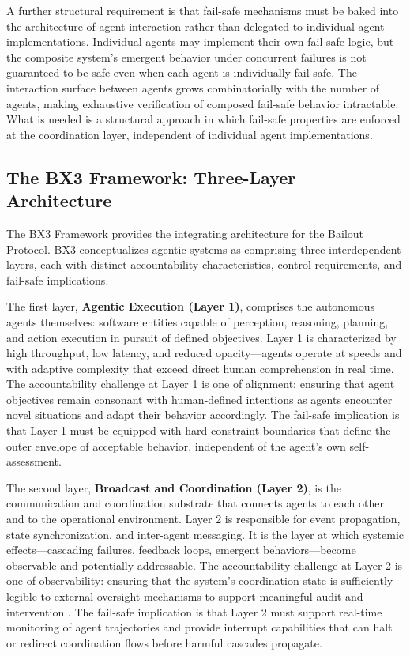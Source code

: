 A further structural requirement is that fail-safe mechanisms must be baked into the architecture of agent interaction rather than delegated to individual agent implementations. Individual agents may implement their own fail-safe logic, but the composite system's emergent behavior under concurrent failures is not guaranteed to be safe even when each agent is individually fail-safe. The interaction surface between agents grows combinatorially with the number of agents, making exhaustive verification of composed fail-safe behavior intractable. What is needed is a structural approach in which fail-safe properties are enforced at the coordination layer, independent of individual agent implementations.

\subsection{The BX3 Framework: Three-Layer Architecture}

The BX3 Framework provides the integrating architecture for the Bailout Protocol. BX3 conceptualizes agentic systems as comprising three interdependent layers, each with distinct accountability characteristics, control requirements, and fail-safe implications.

The first layer, \textbf{Agentic Execution (Layer 1)}, comprises the autonomous agents themselves: software entities capable of perception, reasoning, planning, and action execution in pursuit of defined objectives. Layer 1 is characterized by high throughput, low latency, and reduced opacity—agents operate at speeds and with adaptive complexity that exceed direct human comprehension in real time. The accountability challenge at Layer 1 is one of alignment: ensuring that agent objectives remain consonant with human-defined intentions as agents encounter novel situations and adapt their behavior accordingly. The fail-safe implication is that Layer 1 must be equipped with hard constraint boundaries that define the outer envelope of acceptable behavior, independent of the agent's own self-assessment.

The second layer, \textbf{Broadcast and Coordination (Layer 2)}, is the communication and coordination substrate that connects agents to each other and to the operational environment. Layer 2 is responsible for event propagation, state synchronization, and inter-agent messaging. It is the layer at which systemic effects—cascading failures, feedback loops, emergent behaviors—become observable and potentially addressable. The accountability challenge at Layer 2 is one of observability: ensuring that the system's coordination state is sufficiently legible to external oversight mechanisms to support meaningful audit and intervention \cite{dijkstra1982}. The fail-safe implication is that Layer 2 must support real-time monitoring of agent trajectories and provide interrupt capabilities that can halt or redirect coordination flows before harmful cascades propagate.


